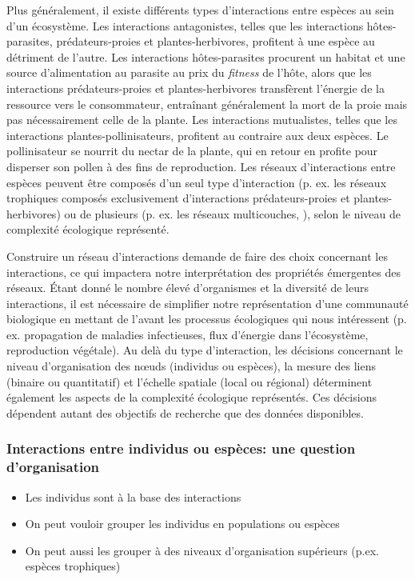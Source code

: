 Plus généralement, il existe différents types d'interactions entre espèces au
sein d'un écosystème. Les interactions antagonistes, telles que les interactions
hôtes-parasites, prédateurs-proies et plantes-herbivores, profitent à une espèce
au détriment de l'autre. Les interactions hôtes-parasites procurent un habitat
et une source d'alimentation au parasite au prix du \textit{fitness} de l'hôte,
alors que les interactions prédateurs-proies et plantes-herbivores transfèrent
l'énergie de la ressource vers le consommateur, entraînant généralement la mort
de la proie mais pas nécessairement celle de la plante. Les interactions
mutualistes, telles que les interactions plantes-pollinisateurs, profitent au
contraire aux deux espèces. Le pollinisateur se nourrit du nectar de la plante,
qui en retour en profite pour disperser son pollen à des fins de reproduction.
Les réseaux d'interactions entre espèces peuvent être composés d'un seul type
d'interaction (p. ex. les réseaux trophiques composés exclusivement
d'interactions prédateurs-proies et plantes-herbivores) ou de plusieurs (p. ex.
les réseaux multicouches, \cite{Pilosof2017Multilayer}), selon le niveau de
complexité écologique représenté.

Construire un réseau d'interactions demande de faire des choix concernant les
interactions, ce qui impactera notre interprétation des propriétés émergentes
des réseaux. Étant donné le nombre élevé d'organismes et la diversité de leurs
interactions, il est nécessaire de simplifier notre représentation d'une
communauté biologique en mettant de l'avant les processus écologiques qui nous
intéressent (p. ex. propagation de maladies infectieuses, flux d'énergie dans
l'écosystème, reproduction végétale). Au delà du type d'interaction, les
décisions concernant le niveau d'organisation des nœuds (individus ou espèces),
la mesure des liens (binaire ou quantitatif) et l'échelle spatiale (local ou
régional) déterminent également les aspects de la complexité écologique
représentés. Ces décisions dépendent autant des objectifs de recherche que des
données disponibles.

\subsubsection{Interactions entre individus ou espèces: une question d'organisation} 

\begin{itemize}
    \item Les individus sont à la base des interactions
    \item On peut vouloir grouper les individus en populations ou espèces
    \item On peut aussi les grouper à des niveaux d'organisation supérieurs (p.ex. espèces trophiques)
\end{itemize}

